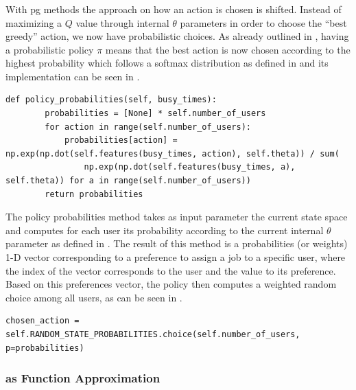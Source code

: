 \documentclass{seal_thesis}
\begin{document}
\subsubsection{}

With \gls{pg} methods the approach on how an action is chosen is shifted. Instead of maximizing a $Q$ value through internal $\theta$ parameters in order to choose the ``best greedy'' action, we now have probabilistic choices. As already outlined in , having a probabilistic policy $\pi$ means that the best action is now chosen according to the highest probability which follows a softmax distribution as defined in  and its implementation can be seen in .

\begin{lstlisting}[caption=Softmax distribution of preferences probabilities,label=lst:softmax_probabilities,style=CustomPython]
    def policy_probabilities(self, busy_times):
        probabilities = [None] * self.number_of_users
        for action in range(self.number_of_users):
            probabilities[action] = np.exp(np.dot(self.features(busy_times, action), self.theta)) / sum(
                np.exp(np.dot(self.features(busy_times, a), self.theta)) for a in range(self.number_of_users))
        return probabilities
\end{lstlisting}

The policy probabilities method takes as input parameter the current state space and computes for each user its probability according to the current internal $\theta$ parameter as defined in . The result of this method is a probabilities (or weights) 1-D vector corresponding to a preference to assign a job to a specific user, where the index of the vector corresponds to the user and the value to its preference. Based on this preferences vector, the policy then computes a weighted random choice among all users, as can be seen in .

\begin{lstlisting}[caption=Probabilistic user choice,label=lst:prob_user_choice,style=CustomPython]
	chosen_action = self.RANDOM_STATE_PROBABILITIES.choice(self.number_of_users, p=probabilities)
\end{lstlisting}

\subsubsection{ as Function Approximation}
\end{document}
